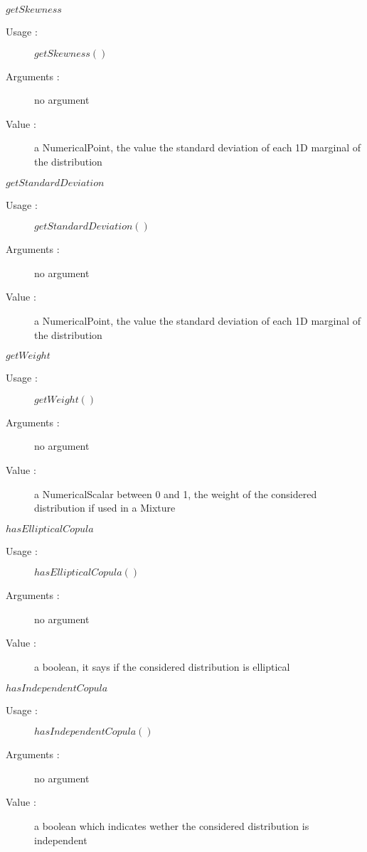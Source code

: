 \begin{description}
\begin{description}
  \item $getSkewness$
    \begin{description}
    \item[Usage :] $getSkewness()$
    \item[Arguments :] no argument
    \item[Value :] a NumericalPoint, the value the standard deviation of each 1D marginal of the distribution
    \end{description}
    \bigskip

  \item $getStandardDeviation$
    \begin{description}
    \item[Usage :] $getStandardDeviation()$
    \item[Arguments :] no argument
    \item[Value :] a NumericalPoint, the value the standard deviation of each 1D marginal of the distribution
    \end{description}
    \bigskip

  \item $getWeight$
    \begin{description}
    \item[Usage :] $getWeight()$
    \item[Arguments :] no argument
    \item[Value :] a NumericalScalar between 0 and 1, the weight of the considered distribution if used in a Mixture
    \end{description}
    \bigskip

  \item $hasEllipticalCopula$
    \begin{description}
    \item[Usage :] $hasEllipticalCopula()$
    \item[Arguments :] no argument
    \item[Value :] a boolean, it says if the considered distribution is elliptical
    \end{description}
    \bigskip

  \item $hasIndependentCopula$
    \begin{description}
    \item[Usage :] $hasIndependentCopula()$
    \item[Arguments :] no argument
    \item[Value :] a boolean which indicates wether the considered distribution is independent
    \end{description}
    \bigskip


\end{description}
\end{description}
